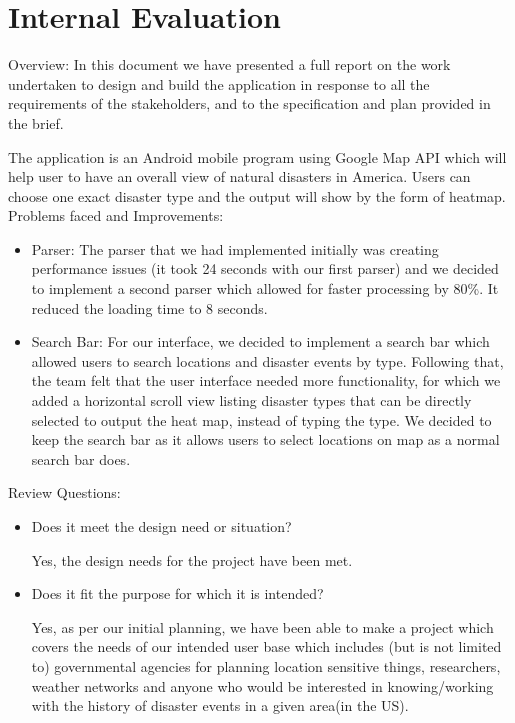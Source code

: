 \documentclass[12pt]{article}
\begin{document}
\section{Internal Evaluation}

Overview: 
In this document we have presented a full report on the work undertaken to design and build the application in response to all the requirements of the stakeholders, and to the specification and plan provided in the brief. 

The application is an Android mobile program using Google Map API which will help user to have an overall view of natural disasters in America. Users can choose one exact disaster type and the output will show by the form of heatmap.
Problems faced and Improvements: 

\begin{itemize}
\item Parser: The parser that we had implemented initially was creating performance issues (it took 24 seconds with our first parser) and we decided to implement a second parser which allowed for faster processing by 80\%. It reduced the loading time to 8 seconds. 
\item Search Bar: For our interface, we decided to implement a search bar which allowed users to search locations and disaster events by type. Following that, the team felt that the user interface needed more functionality, for which we added a horizontal scroll view listing disaster types that can be directly selected to output the heat map, instead of typing the type. We decided to keep the search bar as it allows users to select locations on map as a normal search bar does. 
\end{itemize}

Review Questions:
\begin{itemize}
\item Does it meet the design need or situation? 

Yes, the design needs for the project have been met.
\item Does it fit the purpose for which it is intended? 

Yes, as per our initial planning, we have been able to make a project which covers the needs of our intended user base which includes (but is not limited to) governmental agencies for planning location sensitive things, researchers, weather networks and anyone who would be interested in knowing/working with the history of disaster events in a given area(in the US).
\end{itemize}
\end{document}
